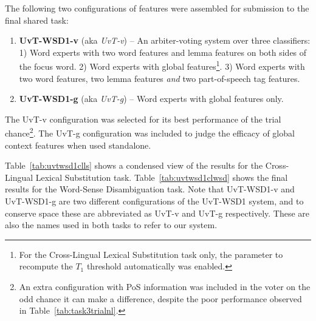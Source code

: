 
The following two configurations of features were assembled for submission to
the final shared task:

\begin{enumerate}
\item \textbf{UvT-WSD1-v} (aka \emph{UvT-v}) -- An arbiter-voting system over
three classifiers: 1) Word experts with two word features and lemma features on
both sides of the focus word. 2) Word experts with global features\footnote{For
the Cross-Lingual Lexical Substitution task only, the parameter to recompute
the $T_1$ threshold automatically was enabled.}. 3) Word experts with two word
features, two lemma features \emph{and} two part-of-speech tag features.
\item \textbf{UvT-WSD1-g} (aka \emph{UvT-g}) -- Word experts with global features
only.
\end{enumerate}

The UvT-v configuration was selected for its best performance of the trial
chance\footnote{An extra configuration with PoS information was included in the
voter on the odd chance it can make a difference, despite the poor performance
observed in Table~\ref{tab:task3trialnl}.}. The UvT-g configuration was included
to judge the efficacy of global context features when used standalone.

Table~\ref{tab:uvtwsd1clls} shows a condensed view of the results for the Cross-Lingual Lexical
Substitution task. Table~\ref{tab:uvtwsd1clwsd} shows the final results for the Word-Sense
Disambiguation task. Note that UvT-WSD1-v and UvT-WSD1-g are two different
configurations of the UvT-WSD1 system, and to conserve space these are
abbreviated as UvT-v and UvT-g respectively. These are also the names used in
both tasks \citep{WSD,CLLS} to refer to our system.

